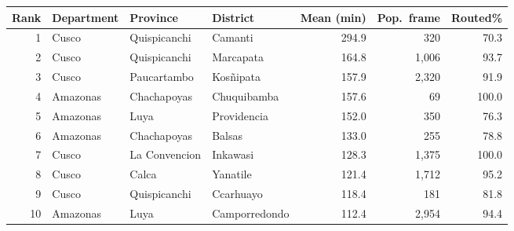 \begin{tabular}{rlllrrr}
\toprule
Rank & Department & Province & District & Mean (min) & Pop.\ frame & Routed\% \\
\midrule
1 & Cusco & Quispicanchi & Camanti & 294.9 & 320 & 70.3 \\
2 & Cusco & Quispicanchi & Marcapata & 164.8 & 1,006 & 93.7 \\
3 & Cusco & Paucartambo & Kosñipata & 157.9 & 2,320 & 91.9 \\
4 & Amazonas & Chachapoyas & Chuquibamba & 157.6 & 69 & 100.0 \\
5 & Amazonas & Luya & Providencia & 152.0 & 350 & 76.3 \\
6 & Amazonas & Chachapoyas & Balsas & 133.0 & 255 & 78.8 \\
7 & Cusco & La Convencion & Inkawasi & 128.3 & 1,375 & 100.0 \\
8 & Cusco & Calca & Yanatile & 121.4 & 1,712 & 95.2 \\
9 & Cusco & Quispicanchi & Ccarhuayo & 118.4 & 181 & 81.8 \\
10 & Amazonas & Luya & Camporredondo & 112.4 & 2,954 & 94.4 \\
\bottomrule
\end{tabular}
